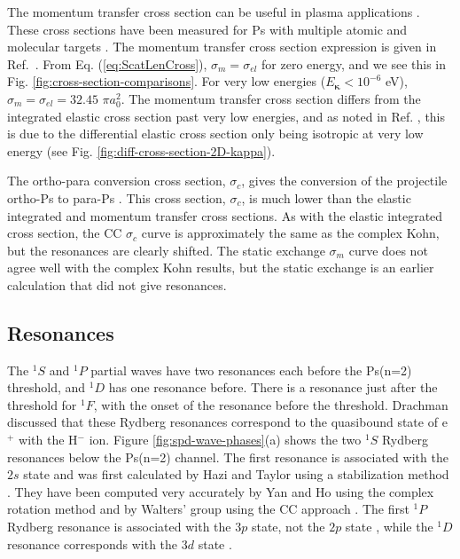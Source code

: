 \documentclass[preprint,showpacs,showkeys,preprintnumbers,amsmath,amssymb,longbibliography,pra,aps]{revtex4-1}
\begin{document}
The momentum transfer cross section can be useful in plasma applications
\cite{Wang2014, McEachran2014}. These cross sections have been measured for Ps
with multiple atomic and molecular targets \cite{Nagashima1998,Saito2003}. The
momentum transfer cross section expression is given in Ref.~\cite{Bransden2003}.
From Eq. (\ref{eq:ScatLenCross}), $\sigma_m = \sigma_{el}$ for zero energy, 
and we see this in Fig. \ref{fig:cross-section-comparisons}. For very low 
energies ($E_{\bm \kappa} < 10^{-6}$ eV),
$\sigma_m = \sigma_{el} = 32.45$ $\pi a_0^2$.
The momentum transfer cross section differs from the integrated elastic cross
section past very low energies, and as 
noted in Ref. \cite{Blackwood2002c}, this is due to the differential elastic 
cross section only being isotropic at very low energy
(see Fig. \ref{fig:diff-cross-section-2D-kappa}).

The ortho-para conversion cross section, $\sigma_c$, gives the conversion
of the projectile ortho-Ps to para-Ps \cite{Hara1975}.
This cross section, $\sigma_c$, is much lower than the elastic integrated and
momentum transfer cross sections. As with the elastic integrated cross
section, the CC $\sigma_c$ curve \cite{Blackwood2002} is approximately the
same as the complex Kohn, but the resonances are clearly shifted. The static
exchange $\sigma_m$ curve \cite{Hara1975} does not agree well with the
complex Kohn results, but the static exchange is an earlier calculation 
that did not give resonances.

\subsection{Resonances}
\label{sec:Resonances}

The $^1S$ and $^1P$ partial waves have two resonances each before the Ps(n=2) 
threshold, and $^1D$ has one resonance before. There is a resonance just 
after the threshold for $^1F$, with the onset of the resonance before the 
threshold. Drachman \cite{Drachman1979} discussed that these Rydberg 
resonances correspond to the quasibound state of e$^+$ with the H$^-$ ion.
Figure \ref{fig:spd-wave-phases}(a) shows the 
two $^1S$ Rydberg resonances below the Ps(n=2) channel. The first resonance 
is associated with the $2s$ state \cite{DiRienzi2002b} and was first 
calculated by Hazi and Taylor using a stabilization method \cite{Hazi1970}. 
They have been computed very accurately by Yan and Ho using the complex 
rotation method \cite{Yan1999} and by Walters' group using the CC 
approach \cite{Walters2004}. The first $^1P$ Rydberg resonance is associated
with the $3p$ state, not the $2p$ state \cite{DiRienzi2002b}, while the $^1D$ 
resonance corresponds with the $3d$ state \cite{DiRienzi2002a}.
\end{document}
